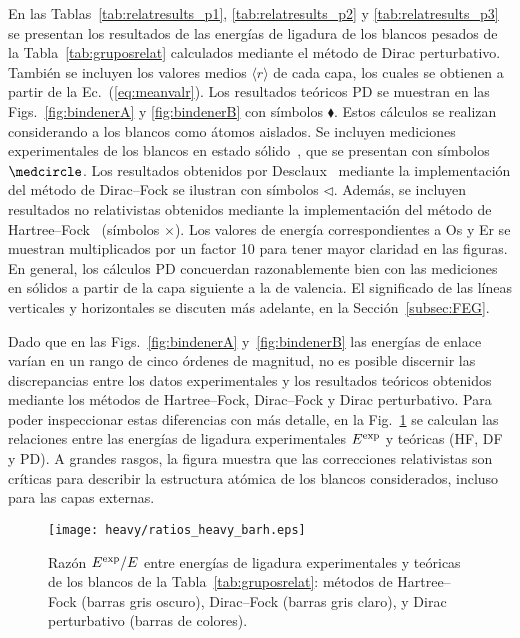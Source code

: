 En las Tablas~\ref{tab:relatresults_p1}, \ref{tab:relatresults_p2} y
\ref{tab:relatresults_p3} se presentan los resultados de las 
energías de ligadura de los blancos pesados de la 
Tabla~\ref{tab:gruposrelat} calculados mediante el método de Dirac 
perturbativo. También se incluyen los valores 
medios $\langle r\rangle$ de cada capa, los cuales se obtienen a partir 
de la Ec.~(\ref{eq:meanvalr}). Los resultados teóricos PD se muestran en 
las Figs.~\ref{fig:bindenerA} y \ref{fig:bindenerB} con símbolos 
$\blacklozenge$. Estos cálculos se realizan considerando a los blancos 
como átomos aislados. Se incluyen mediciones experimentales de los 
blancos en estado sólido~\cite{Williams:95}, que se presentan con 
símbolos $\medcircle$. Los resultados obtenidos por 
Desclaux~\cite{Desclaux:73} mediante la implementación del método de 
Dirac--Fock se ilustran con símbolos $\triangleleft$. Además, se 
incluyen resultados no relativistas obtenidos mediante la implementación 
del método de Hartree--Fock~\cite{FroeseFischer:97} (símbolos $\times$). 
Los valores de energía correspondientes a Os y Er se muestran 
multiplicados por un factor 10 para tener mayor claridad en las figuras. 
En general, los cálculos PD concuerdan razonablemente bien con las 
mediciones en sólidos a partir de la capa siguiente a la de valencia.
El significado de las líneas verticales y horizontales se discuten más 
adelante, en la Sección~\ref{subsec:FEG}.

Dado que en las Figs.~\ref{fig:bindenerA} y~\ref{fig:bindenerB} las 
energías de enlace varían en un rango de cinco órdenes de magnitud, no 
es posible discernir las discrepancias entre los datos experimentales y 
los resultados teóricos obtenidos mediante los métodos de Hartree--Fock, 
Dirac--Fock y Dirac perturbativo. Para poder inspeccionar estas 
diferencias con más detalle, en la Fig.~\ref{fig:ratios} se calculan las 
relaciones entre las energías de ligadura experimentales 
$E^{\mbox{\scriptsize exp}}$ y teóricas (HF, DF y PD). A grandes rasgos,
la figura muestra que las correcciones relativistas son críticas para 
describir la estructura atómica de los blancos considerados, incluso 
para las capas externas. 

\begin{figure}
\centering
\texttt{[image: heavy/ratios\_heavy\_barh.eps]} 
\caption[Razón $E^{\mbox{\scriptsize exp}}/E$ entre energías de ligadura 
experimentales y teóricas.]
{Razón $E^{\mbox{\scriptsize exp}}/E$ entre energías de ligadura 
experimentales y teóricas de los blancos de la 
Tabla~\ref{tab:gruposrelat}: métodos de Hartree--Fock (barras gris 
oscuro), Dirac--Fock (barras gris claro), y Dirac perturbativo (barras 
de colores).}
\label{fig:ratios}
\end{figure}

